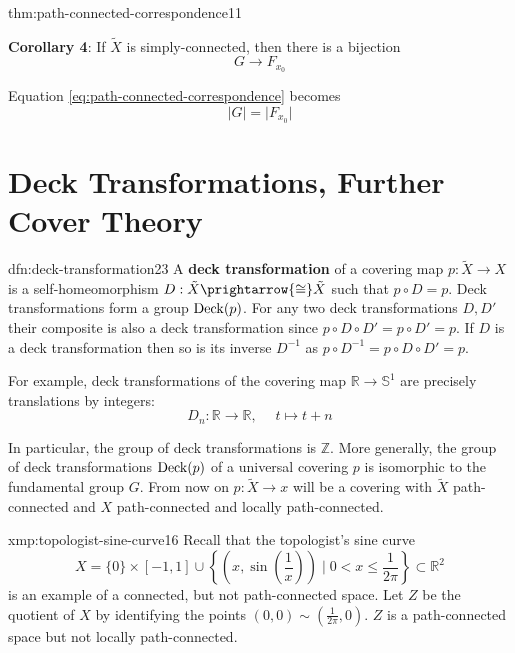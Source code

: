 \documentclass[landscape, 8pt]{extarticle}
\begin{document}
\begin{multicols*}{3}
\begin{thm}{thm:path-connected-correspondence}{11}
	\par\vspace{-5pt}
	\tcbline
	\textbf{Corollary 4}: If $\tilde{X}$ is simply-connected, then there is a bijection
	\vspace{-2pt}
	\[G \to F_{x_{0}}\]
	\par\vspace{-4pt}
	Equation \eqref{eq:path-connected-correspondence} becomes
	\vspace{-4pt}
	\begin{equation}\label{eq:simply-connected-correspondence}
		\lvert G \rvert = \lvert F_{x_{0}} \rvert
	\end{equation}
\end{thm}

\vspace{-12pt}
\section{Deck Transformations, Further Cover Theory}
\vspace{-3pt}
\begin{dfn}{dfn:deck-transformation}{23}
	\vspace{-2pt}
	A \textbf{deck transformation} of a covering map $p : \tilde{X} \to X$ is a self-homeomorphism $D : \tilde{X} \prightarrow{\cong} \tilde{X}$ such that $p \circ D = p$.
	\tcbline
	Deck transformations form a group $\operatorname{Deck}(p)$. For any two deck transformations $D, D'$ their composite is also a deck transformation since $p \circ D \circ D' = p \circ D' = p$. If $D$ is a deck transformation then so is its inverse $D^{-1}$ as $p \circ D^{-1} = p \circ D \circ D' = p$. 

	For example, deck transformations of the covering map $\mathbb{R} \to \mathbb{S}^{1}$ are precisely translations by integers:
	\vspace{-2pt}
	\[D_{n} : \mathbb{R} \to \mathbb{R},\;\quad t \mapsto t+n\]
	\par\vspace{-2pt}
	In particular, the group of deck transformations is $\mathbb{Z}$. More generally, the group of deck transformations $\operatorname{Deck}(p)$ of a universal covering $p$ is isomorphic to the fundamental group $G$. From now on $p : \tilde{X} \to x$ will be a covering with $\tilde{X}$ path-connected and $X$ path-connected and locally path-connected.
\end{dfn}

\begin{xmp}{xmp:topologist-sine-curve}{16}
	Recall that the topologist's sine curve
	\[X = \{0\} \times [-1, 1] \cup \left\{\left(x, \sin\left( \frac{1}{x}\right)\right) \mid 0 < x \le \frac{1}{2\pi}\right\} \subset \mathbb{R}^{2}\]
	is an example of a connected, but not path-connected space. Let $Z$ be the quotient of $X$ by identifying the points $(0, 0) \sim (\frac{1}{2\pi}, 0)$. $Z$ is a path-connected space but not locally path-connected.
\end{xmp}


\end{multicols*}
\end{document}
